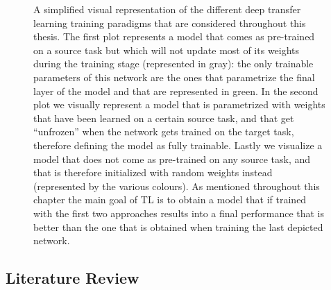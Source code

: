 \begin{figure}[!htb]
\endminipage
\caption{A simplified visual representation of the different deep transfer learning training paradigms that are considered throughout this thesis. The first plot represents a model that comes as pre-trained on a source task but which will not update most of its weights during the training stage (represented in gray): the only trainable parameters of this network are the ones that parametrize the final layer of the model and that are represented in green. In the second plot we visually represent a model that is parametrized with weights that have been learned on a certain source task, and that get ``unfrozen'' when the network gets trained on the target task, therefore defining the model as fully trainable. Lastly we visualize a model that does not come as pre-trained on any source task, and that is therefore initialized with random weights instead (represented by the various colours). As mentioned throughout this chapter the main goal of TL is to obtain a model that if trained with the first two approaches results into a final performance that is better than the one that is obtained when training the last depicted network.}
\label{fig:network_training_approaches}
\end{figure}


\subsection{Literature Review}

